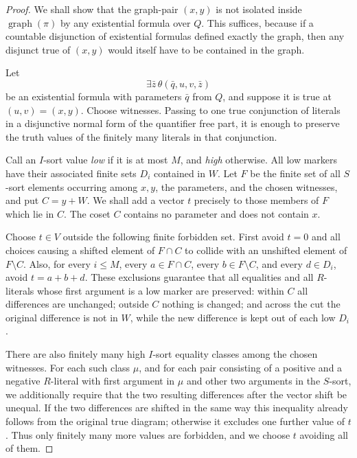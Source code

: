 \documentclass[12pt]{article}
\begin{document}
\begin{proof}
We shall show that the graph-pair $(x,y)$ is not isolated inside
$\operatorname{graph}(\pi)$ by any existential formula over $Q$.  This
suffices, because if a countable disjunction of existential formulas
defined exactly the graph, then any disjunct true of $(x,y)$ would itself
have to be contained in the graph.

Let
\[
        \exists \bar z\,\theta(\bar q,u,v,\bar z)
\]
be an existential formula with parameters $\bar q$ from $Q$, and suppose
it is true at $(u,v)=(x,y)$.  Choose witnesses.  Passing to one true
conjunction of literals in a disjunctive normal form of the quantifier
free part, it is enough to preserve the truth values of the finitely many
literals in that conjunction.

Call an $I$-sort value \emph{low} if it is at most $M$, and
\emph{high} otherwise.  All low markers have their associated finite
sets $D_i$ contained in $W$.  Let $F$ be the finite set of all $S$-sort
elements occurring among $x,y$, the parameters, and the chosen witnesses,
and put $C=y+W$.  We shall add a vector $t$ precisely to those members of
$F$ which lie in $C$.  The coset $C$ contains no parameter and does not
contain $x$.

Choose $t\in V$ outside the following finite forbidden set.  First avoid
$t=0$ and all choices causing a shifted element of $F\cap C$ to collide
with an unshifted element of $F\setminus C$.  Also, for every
$i\le M$, every $a\in F\cap C$, every $b\in F\setminus C$, and every
$d\in D_i$, avoid $t=a+b+d$.  These exclusions guarantee that all
equalities and all $R$-literals whose first argument is a low marker are
preserved: within $C$ all differences are unchanged; outside $C$ nothing
is changed; and across the cut the original difference is not in $W$,
while the new difference is kept out of each low $D_i$.

There are also finitely many high $I$-sort equality classes among the
chosen witnesses.  For each such class $\mu$, and for each pair
consisting of a positive and a negative $R$-literal with first argument
in $\mu$ and other two arguments in the $S$-sort, we additionally require
that the two resulting differences after the vector shift be unequal.
If the two differences are shifted in the same way this inequality
already follows from the original true diagram; otherwise it excludes
one further value of $t$.  Thus only finitely many more values are
forbidden, and we choose $t$ avoiding all of them.


\end{proof}
\end{document}
